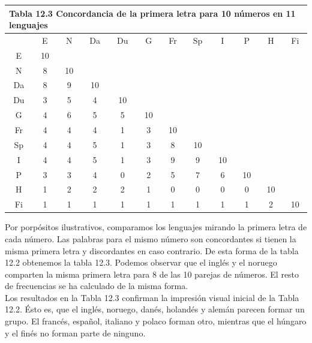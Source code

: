 \documentclass[a4paper, 20pt]{article}
\begin{document}
\begin{table}[h]
\centering
\resizebox{12cm}{!} {
\begin{tabular}{|cccccccccccc|}
\hline
\multicolumn{12}{|l|}{Tabla 12.3 Concordancia de la primera letra para 10 números en 11 lenguajes} \\ \hline
       & E      & N      & Da     & Du     & G     & Fr    & Sp    & I     & P     & H     & Fi    \\ \hline
E      & 10     &        &        &        &       &       &       &       &       &       &       \\
N      & 8      & 10     &        &        &       &       &       &       &       &       &       \\
Da     & 8      & 9      & 10     &        &       &       &       &       &       &       &       \\
Du     & 3      & 5      & 4      & 10     &       &       &       &       &       &       &       \\
G      & 4      & 6      & 5      & 5      & 10    &       &       &       &       &       &       \\
Fr     & 4      & 4      & 4      & 1      & 3     & 10    &       &       &       &       &       \\
Sp     & 4      & 4      & 5      & 1      & 3     & 8     & 10    &       &       &       &       \\
I      & 4      & 4      & 5      & 1      & 3     & 9     & 9     & 10    &       &       &       \\
P      & 3      & 3      & 4      & 0      & 2     & 5     & 7     & 6     & 10    &       &       \\
H      & 1      & 2      & 2      & 2      & 1     & 0     & 0     & 0     & 0     & 10    &       \\
Fi     & 1      & 1      & 1      & 1      & 1     & 1     & 1     & 1     & 1     & 2     & 10    \\ \hline
\end{tabular}
}
\end{table}

Por porpósitos ilustrativos, comparamos los lenguajes mirando la primera letra de cada número. Las palabras para el mismo número son concordantes si tienen la misma primera letra y discordantes en caso contrario. De esta forma de la tabla 12.2 obtenemos la tabla 12.3. Podemos observar que el inglés y el noruego comparten la misma primera letra para 8 de las 10 parejas de números. El resto de frecuencias se ha calculado de la misma forma.\\
Los resultados en la Tabla 12.3 confirman la impresión visual inicial de la Tabla 12.2. Ésto es, que el inglés, noruego, danés, holandés y alemán parecen formar un grupo. El francés, español, italiano y polaco forman otro, mientras que el húngaro y el finés no forman parte de ninguno.\\
\end{document}
